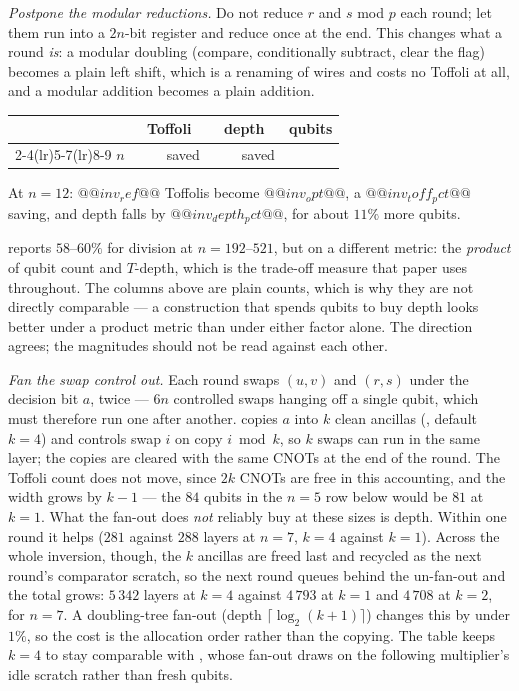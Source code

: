 \emph{Postpone the modular reductions.} Do not reduce $r$ and $s$ mod $p$ each round; let them run
into a $2n$-bit register and reduce once at the end. This changes what a round \emph{is}: a modular
doubling (compare, conditionally subtract, clear the flag) becomes a plain left shift, which is a
renaming of wires and costs no Toffoli at all, and a modular addition becomes a plain addition.

\begin{center}\small
\begin{tabular}{@{}rrrrrrrrr@{}}
\toprule
& \multicolumn{3}{c}{Toffoli} & \multicolumn{3}{c}{depth} & \multicolumn{2}{c}{qubits}\\
\cmidrule(lr){2-4}\cmidrule(lr){5-7}\cmidrule(lr){8-9}
$n$ & \cite{ec:hjnrs20} & \cite{ec:kim26} & saved & \cite{ec:hjnrs20} & \cite{ec:kim26} & saved & \cite{ec:hjnrs20} & \cite{ec:kim26}\\
\midrule
\bottomrule
\end{tabular}
\end{center}

\noindent
At $n=12$: $@@inv_ref@@$ Toffolis become $@@inv_opt@@$, a $@@inv_toff_pct@@$ saving, and depth falls
by $@@inv_depth_pct@@$, for about $11\%$ more qubits.

\cite{ec:kim26} reports $58$--$60\%$ for division at $n=192$--$521$, but on a different metric:
the \emph{product} of qubit count and $T$-depth, which is the trade-off measure that paper uses
throughout. The columns above are plain counts, which is why they are not directly comparable ---
a construction that spends qubits to buy depth looks better under a product metric than under
either factor alone. The direction agrees; the magnitudes should not be read against each other.

\emph{Fan the swap control out.} Each round swaps $(u,v)$ and $(r,s)$ under the decision bit $a$,
twice --- $6n$ controlled swaps hanging off a single qubit, which must therefore run one after
another.  copies $a$ into $k$ clean ancillas (, default
$k=4$) and controls swap $i$ on copy $i \bmod k$, so $k$ swaps can run in the same layer; the copies
are cleared with the same CNOTs at the end of the round. The Toffoli count does not move, since
$2k$ CNOTs are free in this accounting, and the width grows by $k-1$ --- the $84$ qubits in the
$n=5$ row below would be $81$ at $k=1$. What the
fan-out does \emph{not} reliably buy at these sizes is depth. Within one round it helps ($281$
against $288$ layers at $n=7$, $k=4$ against $k=1$). Across the whole inversion, though, the $k$ ancillas are freed
last and recycled as the next round's comparator scratch, so the next round queues behind the
un-fan-out and the total grows: $5\,342$ layers at $k=4$ against $4\,793$ at $k=1$ and $4\,708$ at
$k=2$, for $n=7$. A doubling-tree fan-out (depth $\lceil\log_2(k+1)\rceil$) changes this by under
$1\%$, so the cost is the allocation order rather than the copying. The table keeps $k=4$ to stay
comparable with \cite{ec:kim26}, whose fan-out draws on the following multiplier's idle scratch
rather than fresh qubits.

